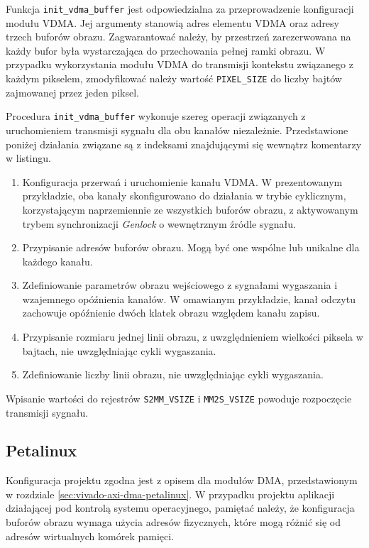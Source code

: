 
Funkcja \texttt{init\_vdma\_buffer} jest odpowiedzialna za przeprowadzenie konfiguracji modułu VDMA. Jej argumenty stanowią adres elementu VDMA oraz adresy trzech buforów obrazu. Zagwarantować należy, by przestrzeń zarezerwowana na każdy bufor była wystarczająca do przechowania pełnej ramki obrazu. W przypadku wykorzystania modułu VDMA do transmisji kontekstu związanego z każdym pikselem, zmodyfikować należy wartość \texttt{PIXEL\_SIZE} do liczby bajtów zajmowanej przez jeden piksel.

Procedura \texttt{init\_vdma\_buffer} wykonuje szereg operacji związanych z uruchomieniem transmisji sygnału dla obu kanałów niezależnie. Przedstawione poniżej działania związane są z indeksami znajdującymi się wewnątrz komentarzy w listingu.
\begin{enumerate}
	\item Konfiguracja przerwań i uruchomienie kanału VDMA.
	W prezentowanym przykładzie, oba kanały skonfigurowano do działania w trybie cyklicznym, korzystającym naprzemiennie ze wszystkich buforów obrazu, z aktywowanym trybem synchronizacji \emph{Genlock} o wewnętrznym źródle sygnału.
	
	\item Przypisanie adresów buforów obrazu. Mogą być one wspólne lub unikalne dla każdego kanału.
	
	\item Zdefiniowanie parametrów obrazu wejściowego z sygnałami wygaszania i wzajemnego opóźnienia kanałów.
	W omawianym przykładzie, kanał odczytu zachowuje opóźnienie dwóch klatek obrazu względem kanału zapisu.
	
	\item Przypisanie rozmiaru jednej linii obrazu, z uwzględnieniem wielkości piksela w bajtach, nie uwzględniając cykli wygaszania.
	
	\item Zdefiniowanie liczby linii obrazu, nie uwzględniając cykli wygaszania.
\end{enumerate}

Wpisanie wartości do rejestrów \texttt{S2MM\_VSIZE} i \texttt{MM2S\_VSIZE} powoduje rozpoczęcie transmisji sygnału.

\subsection{Petalinux}
Konfiguracja projektu zgodna jest z opisem dla modułów DMA, przedstawionym w rozdziale \ref{sec:vivado-axi-dma-petalinux}. %
W przypadku projektu aplikacji działającej pod kontrolą systemu operacyjnego, pamiętać należy, że konfiguracja buforów obrazu wymaga użycia adresów fizycznych, które mogą różnić się od adresów wirtualnych komórek pamięci.

